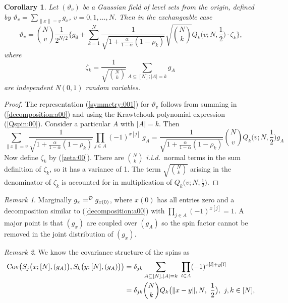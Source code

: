 \documentclass[preprint,11pt]{elsarticle}
\newtheorem{Corollary}{Corollary}
\theoremstyle{remark}
\newtheorem{Remark}{Remark}
\def\iid{\emph{i.i.d.}~}
\begin{document}
{%
\begin{Corollary}\label{symmetrycorr:000}
Let $(\vartheta_{v})$ be a Gaussian field of level sets from the origin, defined by
$\vartheta_{v}
= \sum_{\|x\|=v}g_{x}$, $v = 0,1,\ldots, N$.
 Then in the exchangeable case
\begin{equation}
\vartheta_{v} = {N\choose v}
 \frac{1}{2^{N/2}}\Big \{g_\emptyset +
\sum_{k=1}^{N}
 \frac {1}{\sqrt{1 + \frac{\alpha}{1-\alpha}(1-\rho_k)}}
 \sqrt{{N\choose k}}Q_k\big (v;N,\frac{1}{2}\big )\cdot \zeta_k\Big \},
\label{symmetry:001}
\end{equation}
where 
\begin{equation}
\zeta_k = \frac{1}{\sqrt{{N\choose k}}}\sum_{A\subseteq [N];|A|=k}g_A\
\label{zeta:00}
\end{equation}
are independent N$(0,1)$ random variables. 
\end{Corollary}
%
\begin{proof}
The representation (\ref{symmetry:001}) for $\vartheta_{v}$ follows from summing in (\ref{decomposition:a00}) and using the Krawtchouk polynomial expression (\ref{Qspin:00}). Consider a particular $A$ with $|A|=k$. Then
\[
\sum_{\|x\|=v}\frac {1}{\sqrt{1 + \frac{\alpha}{1-\alpha}(1-\rho_k)}}\prod_{j\in A}(-1)^{x[j]}\ g_A
= \frac {1}{\sqrt{1 + \frac{\alpha}{1-\alpha}(1-\rho_k)}}
{N\choose v}Q_k\big (v;N,\frac{1}{2}\big )g_A
\]
Now define $\zeta_k$ by (\ref{zeta:00}). There are ${N\choose k}$ \iid normal terms in the sum definition of $\zeta_k$, so it has a variance of 1. The term $\sqrt{{N\choose k}}$ arising in 
the denominator of $\zeta_k$ is accounted for in multiplication of $Q_k\big (v;N,\frac{1}{2}\big )$.
\end{proof}
%
\begin{Remark}
Marginally $g_x =^{\cal D}g_{x(0)}$, where $x(0)$ has all entries zero and a decomposition similar to (\ref{decomposition:a00}) 
with 
$\prod_{j\in A}(-1)^{x[j]}=1$.
A major point is that $(g_x)$ are coupled over $(g_A)$ so the spin factor cannot be removed in the joint distribution of $(g_x)$.
\end{Remark}
%
\begin{Remark}
 We know the covariance structure of the spins as
\begin{align}
\text{\rm Cov}\big (S_j\big (x;[N],(g_A)\big ),S_k\big (y;[N],(g_A)\big )\big )
&= \delta_{jk}\sum_{A\subseteq [N], |A|=k}\ \prod_{l\in A}(-1)^{x[l]+y[l]}\nonumber \\
&= \delta_{jk}{N\choose k}Q_k\big ( \|x-y\|, N,\ \frac{1}{2}\big ),\
j,k\in [N],

\end{align}
\end{Remark}}
\end{document}
